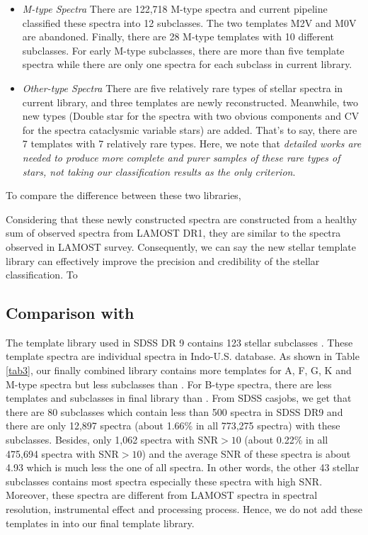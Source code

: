 \documentclass[manuscript]{aastex}
\begin{document}
\begin{itemize}
\item \emph{M-type Spectra}
There are 122,718 M-type spectra and current pipeline classified these spectra into 12 subclasses.
The two templates M2V and M0V are abandoned.
Finally, there are 28 M-type templates with 10 different subclasses.
For early M-type subclasses,
there are more than five template spectra while there are only one spectra for each subclass in current library.


\item \emph{Other-type Spectra}
There are five relatively rare types of stellar spectra in current library,
and three templates are newly reconstructed.
Meanwhile, two new types (Double star for the spectra with two obvious components and CV for the spectra cataclysmic variable stars) are added.
That's to say,
there are 7 templates with 7 relatively rare types.
Here, we note that \emph{detailed works are needed to produce more complete and purer  samples of these rare types of stars,
not taking our classification results as the only criterion}.
\end{itemize}

To compare the difference between these two libraries,

 

Considering that these newly constructed spectra are constructed from  a healthy sum of observed spectra from  LAMOST DR1,
they are  similar to the spectra observed in LAMOST survey.
Consequently, we can say the new stellar template library can effectively improve the precision  and credibility  of the stellar classification.
To

\subsection{Comparison with  \citet{bolton2012spectral}}

The template library used in SDSS DR 9 contains  123 stellar subclasses \citep{bolton2012spectral}.
These template spectra  are individual spectra in  Indo-U.S. database.
As shown in Table \ref{tab3},
our finally combined library contains more templates for A, F, G, K and M-type spectra
but less subclasses than \citet{bolton2012spectral}.
For B-type spectra, there are less templates and subclasses in final library than \citet{bolton2012spectral}.
From SDSS casjobs,
we get that there are 80 subclasses which contain less than 500 spectra in SDSS DR9
and  there are only 12,897 spectra (about 1.66\% in all 773,275 spectra) with these subclasses.
Besides, only 1,062 spectra  with SNR$>10$ (about 0.22\% in all 475,694 spectra with SNR$>10$) and
the average SNR of these spectra is about 4.93 which is much less the one of all spectra.
In other words, the other 43 stellar subclasses contains most spectra especially these spectra with high SNR.
Moreover, these spectra are different from LAMOST spectra in spectral resolution, instrumental effect and processing process.
Hence, we do not add these templates in  \citet{bolton2012spectral} into our final template library.
\end{document}
